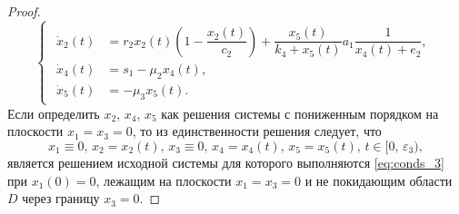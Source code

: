\documentclass[14pt,a4paper]{extarticle}
\begin{document}
\begin{proof}
		\begin{equation*}
			\begin{cases}
				\begin{aligned}
					\dot{x}_2(t) &= r_2x_2(t)\left(1-\dfrac{x_2(t)}{c_2}\right)+\dfrac{x_5(t)}{k_4+x_5(t)}a_1\dfrac{1}{x_4(t)+e_2},\\
					\dot{x}_4(t) &= s_1-\mu_2x_4(t),\\
					\dot{x}_5(t) &= -\mu_3x_5(t).
				\end{aligned}
			\end{cases}
		\end{equation*}
		Если определить $x_2,\, x_4,\, x_5$ как решения системы с пониженным порядком на плоскости $x_1=x_3=0$, то из единственности решения следует, что
		\[x_1\equiv0,\, x_2=x_2(t),\, x_3\equiv0,\, x_4=x_4(t),\, x_5=x_5(t),\, t\in[0,\,\varepsilon_3),\]
		является решением исходной системы для которого выполняются \ref{eq:conds_3} при $x_1(0)=0$, лежащим на плоскости $x_1=x_3=0$ и не покидающим области $D$ через границу $x_3=0$.
	

\end{proof}
\end{document}
